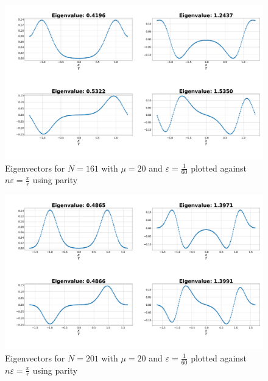 \documentclass[11pt, letterpaper, onecolumn]{article}
\begin{document}
 	\begin{figure} [H] 
	\begin{center}
	\includegraphics[width=15cm]{"inf_vol_lim_N161.png"}
	\caption{Eigenvectors for $N=161$ with $\mu=20$ and $\varepsilon=\frac{1}{60}$ plotted against $n\varepsilon=\frac{x}{r}$ using parity}
	\end{center}
	\end{figure}

 	\begin{figure} [H] 
	\begin{center}
	\includegraphics[width=15cm]{"inf_vol_lim_N201.png"}
	\caption{Eigenvectors for $N=201$ with $\mu=20$ and $\varepsilon=\frac{1}{60}$ plotted against $n\varepsilon=\frac{x}{r}$ using parity}
	\end{center}
	\end{figure}
	
\end{document}
